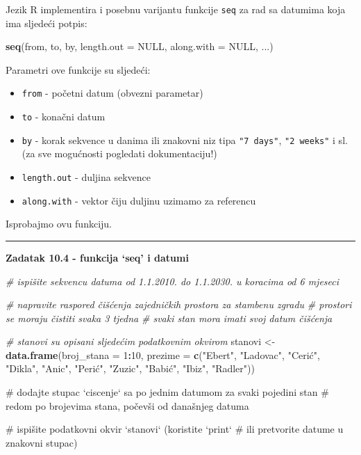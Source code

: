 \documentclass[]{book}
\newenvironment{Shaded}{\begin{snugshade}}{\end{snugshade}}
\newcommand{\KeywordTok}[1]{\textcolor[rgb]{0.13,0.29,0.53}{\textbf{#1}}}
\newcommand{\DataTypeTok}[1]{\textcolor[rgb]{0.13,0.29,0.53}{#1}}
\newcommand{\DecValTok}[1]{\textcolor[rgb]{0.00,0.00,0.81}{#1}}
\newcommand{\StringTok}[1]{\textcolor[rgb]{0.31,0.60,0.02}{#1}}
\newcommand{\CommentTok}[1]{\textcolor[rgb]{0.56,0.35,0.01}{\textit{#1}}}
\newcommand{\OtherTok}[1]{\textcolor[rgb]{0.56,0.35,0.01}{#1}}
\newcommand{\OperatorTok}[1]{\textcolor[rgb]{0.81,0.36,0.00}{\textbf{#1}}}
\newcommand{\NormalTok}[1]{#1}
\providecommand{\tightlist}{%
  \setlength{\itemsep}{0pt}\setlength{\parskip}{0pt}}
\theoremstyle{definition}
\theoremstyle{definition}
\theoremstyle{definition}
\theoremstyle{remark}
\begin{document}
Jezik R implementira i posebnu varijantu funkcije \texttt{seq} za rad sa
datumima koja ima sljedeći potpis:

\begin{Shaded}
\begin{Highlighting}[]
\KeywordTok{seq}\NormalTok{(from, to, by, }\DataTypeTok{length.out =} \OtherTok{NULL}\NormalTok{, }\DataTypeTok{along.with =} \OtherTok{NULL}\NormalTok{, ...)}
\end{Highlighting}
\end{Shaded}

Parametri ove funkcije su sljedeći:

\begin{itemize}
\tightlist
\item
  \texttt{from} - početni datum (obvezni parametar)
\item
  \texttt{to} - konačni datum
\item
  \texttt{by} - korak sekvence u danima ili znakovni niz tipa
  \texttt{"7\ days"}, \texttt{"2\ weeks"} i sl. (za sve mogućnosti
  pogledati dokumentaciju!)
\item
  \texttt{length.out} - duljina sekvence
\item
  \texttt{along.with} - vektor čiju duljinu uzimamo za referencu
\end{itemize}

Isprobajmo ovu funkciju.

\begin{center}\rule{0.5\linewidth}{\linethickness}\end{center}

\textbf{Zadatak 10.4 - funkcija `seq' i datumi}

\begin{Shaded}
\begin{Highlighting}[]
\CommentTok{# ispišite sekvencu datuma od 1.1.2010. do 1.1.2030. u koracima od 6 mjeseci}


\CommentTok{# napravite raspored čišćenja zajedničkih prostora za stambenu zgradu}
\CommentTok{# prostori se moraju čistiti svaka 3 tjedna}
\CommentTok{# svaki stan mora imati svoj datum čišćenja}

\CommentTok{# stanovi su opisani sljedećim podatkovnim okvirom}
\NormalTok{stanovi <-}\StringTok{ }\KeywordTok{data.frame}\NormalTok{(}\DataTypeTok{broj_stana =} \DecValTok{1}\OperatorTok{:}\DecValTok{10}\NormalTok{,}
                      \DataTypeTok{prezime =} \KeywordTok{c}\NormalTok{(}\StringTok{"Ebert"}\NormalTok{, }\StringTok{"Ladovac"}\NormalTok{, }\StringTok{"Cerić"}\NormalTok{, }\StringTok{"Dikla"}\NormalTok{, }\StringTok{"Anic"}\NormalTok{,}
                                  \StringTok{"Perić"}\NormalTok{, }\StringTok{"Zuzic", "}\NormalTok{Babić}\StringTok{", "}\NormalTok{Ibiz}\StringTok{", "}\NormalTok{Radler}\StringTok{"))}

\StringTok{# dodajte stupac `ciscenje` sa po jednim datumom za svaki pojedini stan }
\StringTok{# redom po brojevima stana, počevši od današnjeg datuma}


\StringTok{# ispišite podatkovni okvir `stanovi` (koristite `print` }
\StringTok{# ili pretvorite datume u znakovni stupac)}
\end{Highlighting}
\end{Shaded}
\end{document}
